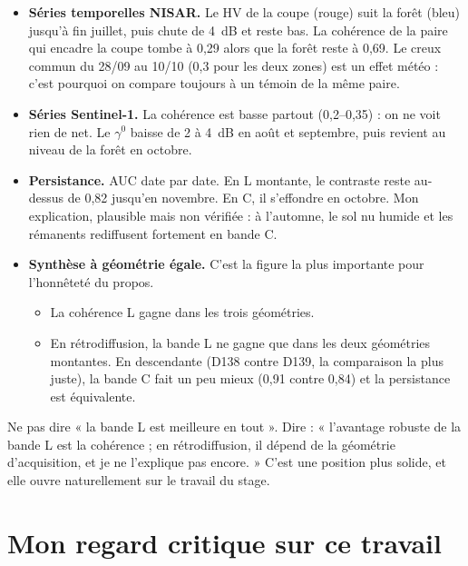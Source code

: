 \documentclass[11pt,a4paper]{article}
\begin{document}
\begin{itemize}
\item \textbf{Séries temporelles NISAR.} Le HV de la coupe (rouge) suit la forêt (bleu) jusqu'à fin juillet, puis
  chute de 4~dB et reste bas. La cohérence de la paire qui encadre la coupe tombe à 0,29 alors que la forêt reste
  à 0,69. Le creux commun du 28/09 au 10/10 (0,3 pour les deux zones) est un effet météo : c'est pourquoi on compare
  toujours à un témoin de la même paire.
\item \textbf{Séries Sentinel-1.} La cohérence est basse partout (0,2--0,35) : on ne voit rien de net. Le $\gamma^0$
  baisse de 2 à 4~dB en août et septembre, puis revient au niveau de la forêt en octobre.
\item \textbf{Persistance.} AUC date par date. En L montante, le contraste reste au-dessus de 0,82 jusqu'en
  novembre. En C, il s'effondre en octobre. Mon explication, plausible mais non vérifiée : à l'automne, le sol nu
  humide et les rémanents rediffusent fortement en bande C.
\item \textbf{Synthèse à géométrie égale.} C'est la figure la plus importante pour l'honnêteté du propos.
  \begin{itemize}
  \item La cohérence L gagne dans les trois géométries.
  \item En rétrodiffusion, la bande L ne gagne que dans les deux géométries montantes. En descendante (D138 contre
    D139, la comparaison la plus juste), la bande C fait un peu mieux (0,91 contre 0,84) et la persistance est
    équivalente.
  \end{itemize}
\end{itemize}

\begin{piege}
Ne pas dire « la bande L est meilleure en tout ». Dire : « l'avantage robuste de la bande L est la cohérence ; en
rétrodiffusion, il dépend de la géométrie d'acquisition, et je ne l'explique pas encore. » C'est une position plus
solide, et elle ouvre naturellement sur le travail du stage.
\end{piege}

\section{Mon regard critique sur ce travail}
\end{document}
